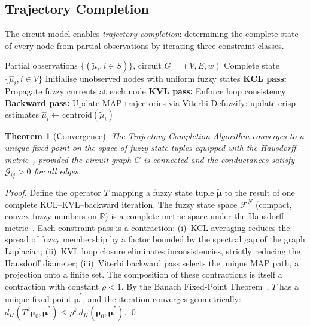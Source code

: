 \documentclass[11pt,twocolumn,a4paper]{article}
\newtheorem{theorem}{Theorem}[section]
\newcommand{\R}{\mathbb{R}}
\newcommand{\Gcond}{\mathcal{G}}
\begin{document}
\subsection{Trajectory Completion}

The circuit model enables \emph{trajectory completion}: determining
the complete state of every node from partial observations by
iterating three constraint classes.

\begin{algorithm}[H]
\caption{Trajectory Completion Algorithm}
\label{alg:completion}
\begin{algorithmic}[1]
\Require Partial observations $\{(\tilde{\mu}_i, i \in S)\}$,
  circuit $G = (V, E, w)$
\Ensure Complete state $\{\hat{\mu}_i, i \in V\}$
\State Initialise unobserved nodes with uniform fuzzy states
\Repeat
  \State \textbf{KCL pass:} Propagate fuzzy currents at each node
  \State \textbf{KVL pass:} Enforce loop consistency
  \State \textbf{Backward pass:} Update MAP trajectories via Viterbi
  \State Defuzzify: update crisp estimates
    $\hat{\mu}_i \gets \mathrm{centroid}(\tilde{\mu}_i)$
\end{algorithmic}
\end{algorithm}

\begin{theorem}[Convergence]
\label{thm:convergence}
The Trajectory Completion Algorithm converges to a unique fixed point
on the space of fuzzy state tuples equipped with the Hausdorff
metric~\citep{beer1993}, provided the circuit graph $G$ is connected
and the conductances satisfy $\Gcond_{ij} > 0$ for all edges.
\end{theorem}

\begin{proof}
Define the operator $T$ mapping a fuzzy state tuple
$\tilde{\boldsymbol{\mu}}$ to the result of one complete
KCL--KVL--backward iteration.  The fuzzy state space
$\mathcal{F}^N$ (compact, convex fuzzy numbers on $\R$) is a
complete metric space under the Hausdorff
metric~\citep{beer1993,kreyszig1978}.  Each constraint pass is
a contraction: (i)~KCL averaging reduces the spread of fuzzy
membership by a factor bounded by the spectral gap of the graph
Laplacian; (ii)~KVL loop closure eliminates inconsistencies, strictly
reducing the Hausdorff diameter; (iii)~Viterbi backward pass selects
the unique MAP path, a projection onto a finite set.  The composition
of these contractions is itself a contraction with constant
$\rho < 1$.  By the Banach Fixed-Point
Theorem~\citep{granas2003}, $T$ has a unique fixed point
$\tilde{\boldsymbol{\mu}}^*$, and the iteration converges
geometrically: $d_H(T^k\tilde{\boldsymbol{\mu}}_0,
\tilde{\boldsymbol{\mu}}^*) \leq \rho^k\,
d_H(\tilde{\boldsymbol{\mu}}_0,
\tilde{\boldsymbol{\mu}}^*)$.  \qed
\end{proof}
\end{document}

